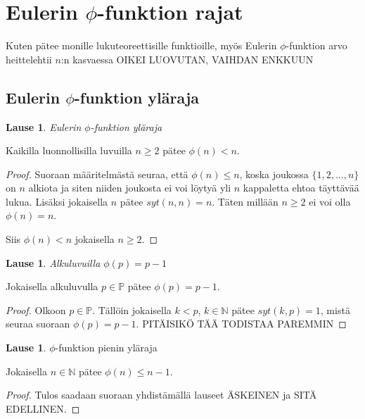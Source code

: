 \documentclass{article}
\theoremstyle{definition}
\newtheorem{lause}[subsection]{Lause}
\begin{document}
\section{Eulerin $\phi$-funktion rajat}

Kuten pätee monille lukuteoreettisille funktioille, myös Eulerin $\phi$-funktion arvo heittelehtii $n$:n kasvaessa OIKEI LUOVUTAN, VAIHDAN ENKKUUN

\subsection{Eulerin $\phi$-funktion yläraja}

\begin{lause}{\emph{Eulerin $\phi$-funktion yläraja}}

Kaikilla luonnollisilla luvuilla $n \geq 2$ pätee $\phi(n) < n$.

\begin{proof}

Suoraan määritelmästä seuraa, että $\phi(n) \leq n$, koska joukossa $\{1,2,...,n\}$ on $n$ alkiota ja siten niiden joukosta ei voi löytyä yli $n$ kappaletta ehtoa täyttävää lukua. Lisäksi jokaisella $n$ pätee $syt(n,n) = n$. Täten millään $n \geq 2$ ei voi olla $\phi(n) = n$.

Siis $\phi(n) < n$ jokaisella $n \geq 2$.

\end{proof}

\end{lause}

\begin{lause}{\emph{Alkuluvuilla $\phi(p)=p-1$}}

Jokaisella alkuluvulla $p\in\mathbb{P}$ pätee $\phi(p)=p-1$.

\begin{proof}

Olkoon $p\in\mathbb{P}$. Tällöin jokaisella $k<p$, $k\in\mathbb{N}$ pätee $syt(k, p)=1$, mistä seuraa suoraan $\phi(p)=p-1$. PITÄISIKÖ TÄÄ TODISTAA PAREMMIN

\end{proof}

\end{lause}

\begin{lause}{$\phi$-funktion pienin yläraja}

Jokaisella $n \in \mathbb{N}$ pätee $\phi(n)\leq {n-1}$.

\begin{proof}

Tulos saadaan suoraan yhdistämällä lauseet ÄSKEINEN ja SITÄ EDELLINEN.

\end{proof}

\end{lause}
\end{document}
